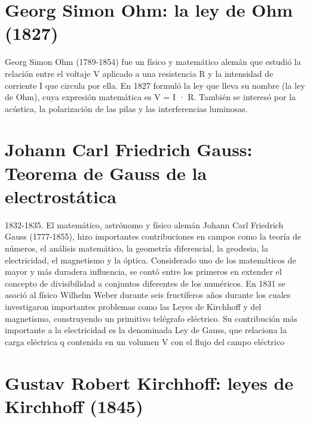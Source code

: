 \documentclass{article}
\begin{document}
\section{Georg Simon Ohm: la ley de Ohm (1827)}

Georg Simon Ohm (1789-1854) fue un físico y matemático alemán que estudió la relación entre el voltaje V aplicado a una resistencia R y la intensidad de corriente I que circula por ella. En 1827 formuló la ley que lleva su nombre (la ley de Ohm), cuya expresión matemática es V = I · R. También se interesó por la acústica, la polarización de las pilas y las interferencias luminosas. \citep{HDE}\\



\section{Johann Carl Friedrich Gauss: Teorema de Gauss de la electrostática}

1832-1835. El matemático, astrónomo y físico alemán Johann Carl Friedrich Gauss (1777-1855), hizo importantes contribuciones en campos como la teoría de números, el análisis matemático, la geometría diferencial, la geodesia, la electricidad, el magnetismo y la óptica. Considerado uno de los matemáticos de mayor y más duradera influencia, se contó entre los primeros en extender el concepto de divisibilidad a conjuntos diferentes de los numéricos. En 1831 se asoció al físico Wilhelm Weber durante seis fructíferos años durante los cuales investigaron importantes problemas como las Leyes de Kirchhoff y del magnetismo, construyendo un primitivo telégrafo eléctrico. Su contribución más importante a la electricidad es la denominada Ley de Gauss, que relaciona la carga eléctrica q contenida en un volumen V con el flujo del campo eléctrico 


\section{Gustav Robert Kirchhoff: leyes de Kirchhoff (1845)}
\end{document}
